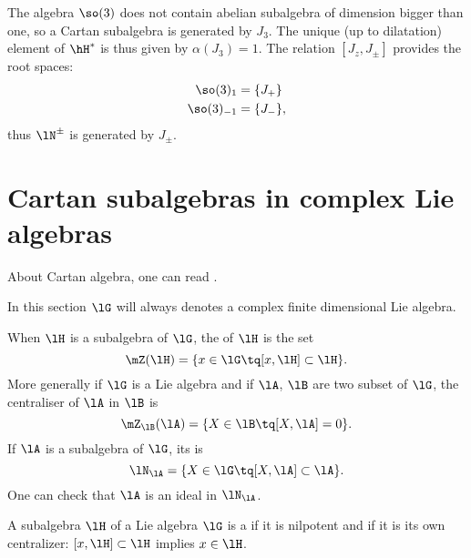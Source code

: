 The algebra $\so(3)$ does not contain abelian subalgebra of dimension bigger than one, so a Cartan subalgebra is generated by $J_3$. The unique (up to dilatation) element of $\hH^*$ is thus given by $\alpha(J_3)=1$. The relation $[J_z,J_{\pm}]$ provides the root spaces:
\begin{equation}
	\begin{aligned}
		\so(3)_1    & =\{ J_+ \}  \\
		\so(3)_{-1} & =\{ J_- \},
	\end{aligned}
\end{equation}
thus $\lN^{\pm}$ is generated by $J_{\pm}$.


\section{Cartan subalgebras in complex Lie algebras}
\label{SecCartaninComplex}
About Cartan algebra, one can read \cite{Dragan,Berndt,Hochschild,SamelsonNotesLieAlg}.

In this section $\lG$ will always denotes a complex finite dimensional Lie algebra.

\begin{definition}\label{PgDefCentralisateur}
	When \( \lH\) is a subalgebra of \( \lG\), the  of \( \lH\) is the set
	\begin{equation}
		\mZ(\lH)=\{x\in\lG\tq [x,\lH]\subset\lH\}.
	\end{equation}
	More generally if $\lG$ is a Lie algebra and if $\lA$, $\lB$ are two subset of $\lG$, the centraliser of $\lA$ in $\lB$ is
	\begin{equation}
		\mZ_{\lB}(\lA)=\{X\in\lB\tq [X,\lA]=0\}.
	\end{equation}
	If $\lA$ is a subalgebra of $\lG$, its  is
	\begin{equation}
		\lN_{\lA}=\{X\in\lG\tq [X,\lA]\subset\lA\}.
	\end{equation}
	One can check that $\lA$ is an ideal in $\lN_{\lA}$.
\end{definition}

\begin{definition}      \label{DEFooUNWJooVsBZgJ}
	A subalgebra $\lH$ of a Lie algebra $\lG$ is a  if it is nilpotent and if it is its own centralizer: $[x,\lH]\subset\lH$ implies $x\in\lH$.
\end{definition}

